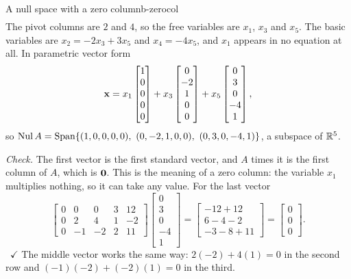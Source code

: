 \documentclass[11pt]{article}
\begin{document}
\begin{exmp}{A null space with a zero column}{b-zerocol}
\begin{align*}
\end{align*}
The pivot columns are $2$ and $4$, so the free variables are $x_1$, $x_3$ and $x_5$. The basic variables are $x_2=-2x_3+3x_5$ and $x_4=-4x_5$, and $x_1$ appears in no equation at all. In parametric vector form
\[
\mathbf{x}=x_1\begin{bmatrix}1\\0\\0\\0\\0\end{bmatrix}+x_3\begin{bmatrix}0\\-2\\1\\0\\0\end{bmatrix}+x_5\begin{bmatrix}0\\3\\0\\-4\\1\end{bmatrix},
\]
so $\Nul A=\Span\{(1,0,0,0,0),\ (0,-2,1,0,0),\ (0,3,0,-4,1)\}$, a subspace of $\mathbb{R}^5$.

\emph{Check.} The first vector is the first standard vector, and $A$ times it is the first column of $A$, which is $\mathbf{0}$. This is the meaning of a zero column: the variable $x_1$ multiplies nothing, so it can take any value. For the last vector
\[
\begin{bmatrix}0&0&0&3&12\\0&2&4&1&-2\\0&-1&-2&2&11\end{bmatrix}\begin{bmatrix}0\\3\\0\\-4\\1\end{bmatrix}=\begin{bmatrix}-12+12\\6-4-2\\-3-8+11\end{bmatrix}=\begin{bmatrix}0\\0\\0\end{bmatrix}.
\]
\ $\checkmark$ The middle vector works the same way: $2(-2)+4(1)=0$ in the second row and $(-1)(-2)+(-2)(1)=0$ in the third.
\end{exmp}
\end{document}
